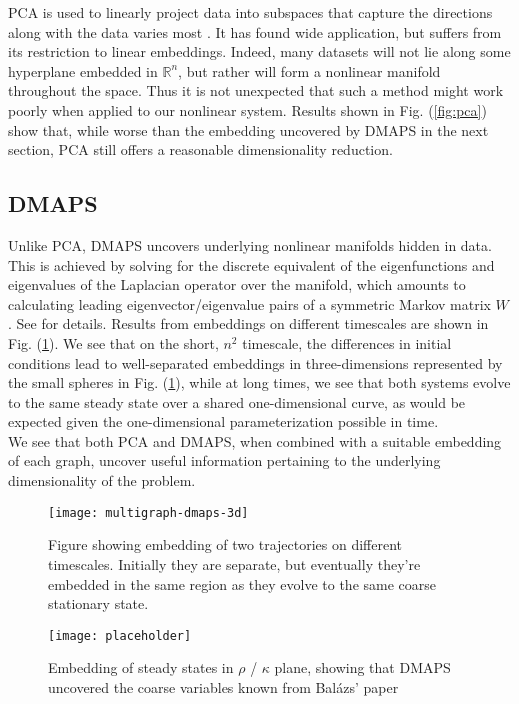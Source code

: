 \documentclass[12pt]{article}
\begin{document}
\begin{onehalfspace}
PCA is used to linearly project data into subspaces that capture the directions along with the data varies most \cite{jolliffe_principal_2014}. It has found wide application, but suffers from its restriction to linear embeddings. Indeed, many datasets will not lie along some hyperplane embedded in $\mathbb{R}^n$, but rather will form a nonlinear manifold throughout the space. Thus it is not unexpected that such a method might work poorly when applied to our nonlinear system. Results shown in Fig. (\ref{fig:pca}) show that, while worse than the embedding uncovered by DMAPS in the next section, PCA still offers a reasonable dimensionality reduction.

\subsection{DMAPS}

Unlike PCA, DMAPS uncovers underlying nonlinear manifolds hidden in data. This is achieved by solving for the discrete equivalent of the eigenfunctions and eigenvalues of the Laplacian operator over the manifold, which amounts to calculating leading eigenvector/eigenvalue pairs of a symmetric Markov matrix $W$. See \cite{coifman_diffusion_2006, nadler_diffusion_2006} for details. Results from embeddings on different timescales are shown in Fig. (\ref{fig:dmaps-results}). We see that on the short, $n^2$ timescale, the differences in initial conditions lead to well-separated embeddings in three-dimensions represented by the small spheres in Fig. (\ref{fig:dmaps-results}), while at long times, we see that both systems evolve to the same steady state over a shared one-dimensional curve, as would be expected given the one-dimensional parameterization possible in time. \\

We see that both PCA and DMAPS, when combined with a suitable embedding of each graph, uncover useful information pertaining to the underlying dimensionality of the problem.

\begin{figure}[ht!]
  \centering
  \texttt{[image: multigraph-dmaps-3d]}
  \caption{Figure showing embedding of two trajectories on different timescales. Initially they are separate, but eventually they're embedded in the same region as they evolve to the same coarse stationary state. \label{fig:dmaps-results}}
\end{figure}

\begin{figure}[ht!]
  \centering
  \texttt{[image: placeholder]}
  \caption{Embedding of steady states in $\rho$ / $\kappa$ plane, showing that DMAPS uncovered the coarse variables known from Bal\'{a}zs' paper}
  \label{fig:label}
\end{figure}



\end{onehalfspace}
\end{document}

